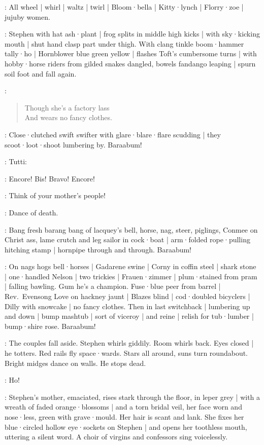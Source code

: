 :
All wheel |
whirl |
waltz |
twirl |
Bloom·bella |
Kitty·lynch |
Florry·zoe |
jujuby women.

:
Stephen with hat ash·plant |
frog splits in middle high kicks |
with sky·kicking mouth |
shut hand clasp part under thigh.
With clang tinkle boom·hammer tally·ho |
Hornblower blue green yellow |
flashes Toft's cumbersome turns |
with hobby·horse riders from gilded snakes dangled,
bowels fandango leaping |
spurn soil foot and fall again.

\Pianola:
\begin{verse}
%
    Though she's a factory lass\\
    And wears no fancy clothes.
\end{verse}

:
Close·clutched swift swifter with glare·blare·flare scudding |
they scoot·loot·shoot lumbering by.
Baraabum!

:
Tutti:

\All:
Encore!
Bis!
Bravo!
Encore!

\Simon[6b]:
Think of your mother's people!

\Stephen:
Dance of death.

:
Bang fresh barang bang of lacquey's bell,
%
horse,
nag,
steer,
piglings,
Conmee on Christ ass,
lame crutch and leg sailor in cock·boat |
arm·folded rope·pulling hitching stamp |
hornpipe through and through.
Baraabum!

:
On nags hogs bell·horses |
Gadarene swine |
Corny in coffin steel |
shark stone |
one·handled Nelson |
two trickies |
Frauen·zimmer |
plum·stained from pram |
falling bawling.
Gum he's a champion.
Fuse·blue peer from barrel |
Rev.~Evensong Love on hackney jaunt |
Blazes blind |
cod·doubled bicyclers |
Dilly with snowcake |
no fancy clothes.
Then in last switchback |
lumbering up and down |
bump mashtub |
sort of viceroy |
and reine |
relish for tub·lumber |
bump·shire rose.
%
Baraabum!

:
The couples fall aside.
Stephen whirls giddily.
Room whirls back.
Eyes closed |
he totters.
Red rails fly space·wards.
Stars all around,
suns turn roundabout.
Bright midges dance on walls.
He stops dead.

\Stephen:
Ho!

:
Stephen's mother,
emaciated,
rises stark through the floor,
in leper grey |
with a wreath of faded orange·blossoms |
and a torn bridal veil,
her face worn and nose·less,
green with grave·mould.
Her hair is scant and lank.
%
She fixes her blue·circled hollow eye·sockets on Stephen |
and opens her toothless mouth,
uttering a silent word.
A choir of virgins and confessors sing voicelessly.

